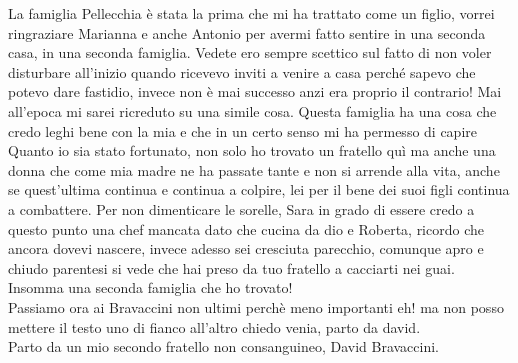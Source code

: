 La famiglia Pellecchia è stata la prima che mi ha trattato come un figlio, vorrei ringraziare Marianna e anche Antonio per avermi fatto sentire in una seconda casa, in una seconda famiglia. Vedete ero sempre scettico sul fatto di non voler disturbare all'inizio quando ricevevo inviti a venire a casa perché sapevo che potevo dare fastidio, invece non è mai successo anzi era proprio il contrario! Mai all'epoca mi sarei ricreduto su una simile cosa. Questa famiglia ha una cosa che credo leghi bene con la mia e che in un certo senso mi ha permesso di capire Quanto io sia stato fortunato, non solo ho trovato un fratello quì ma anche una donna che come mia madre ne ha passate tante e non si arrende alla vita, anche se quest'ultima continua e continua a colpire, lei per il bene dei suoi figli continua a combattere. Per non dimenticare le sorelle, Sara in grado di essere credo a questo punto una chef mancata dato che cucina da dio e Roberta, ricordo che ancora dovevi nascere, invece adesso sei cresciuta parecchio, comunque apro e chiudo parentesi si vede che hai preso da tuo fratello a cacciarti nei guai. Insomma una seconda famiglia che ho trovato!\\

Passiamo ora ai Bravaccini non ultimi perchè meno importanti eh! ma non posso mettere il testo uno di fianco all'altro chiedo venia, parto da david.\\

Parto da un mio secondo fratello non consanguineo, David Bravaccini.\\

